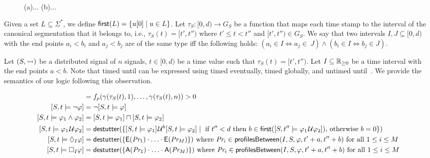 \begin{figure}
	\caption{\TODO (a)... (b)...}
\end{figure}

Given a set $L \subseteq \Sigma^*$, we define $\first(L) = \{ u[0] \st u \in L\}$.
Let $\tau_S : [0,d) \to G_S$ be a function that maps each time stamp to the interval of the canonical segmentation that it belongs to, i.e., $\tau_S(t) = [t', t'')$ where $t' \leq t < t''$ and $[t', t'') \in G_S$.
We say that two intervals $I, J \subseteq [0,d)$ with the end points $a_i < b_i$ and $a_j < b_j$ are of the same type iff the following holds: $(a_i \in I \iff a_j \in~J) \land (b_i \in I \iff b_j \in J)$.

Let $(S, {\rightsquigarrow})$ be a distributed signal of $n$ signals, $t \in [0,d)$ be a time value such that $\tau_S(t) = [t', t'')$.
Let $I \subseteq \mathbb{R}_{\geq 0}$ be a time interval with the end points $a < b$.
Note that timed until can be expressed using timed eventually, timed globally, and untimed until~\cite{DBLP:journals/sttt/MalerN13}.
We provide the semantics of our logic following this observation.

\scriptsize
\begin{align*}
	[S,t \models p] &=  f_p(\gamma(\tau_S(t), 1), \ldots, \gamma(\tau_S(t), n)) > 0 \\
	[S,t \models \lnot \varphi] &= \lnot [S,t \models \varphi] \\
	[S,t \models \varphi_1 \land \varphi_2] &= [S,t \models \varphi_1] \sqcap [S,t \models \varphi_2] \\
	[S,t \models \varphi_1 \until \varphi_2] &= \destutter(\{ [S,t \models \varphi_1] \until^b [S,t \models \varphi_2] \st \text{ if $t'' < d$ then $b \in \first([S,t'' \models \varphi_1 \until \varphi_2])$, otherwise $b = 0$} \}) \\
	[S,t \models \LTLf_I \varphi] &= \destutter(\{ \mathsf{E}(\textit{Pr}_1) \cdot \ldots \cdot \mathsf{E}(\textit{Pr}_M) \}) \text{ where $\textit{Pr}_i \in \mathsf{profilesBetween}(I, S, \varphi, t' + a, t'' + b)$ for all $1 \leq i \leq M$} \\
	[S,t \models \LTLg_I \varphi] &= \destutter(\{ \mathsf{A}(\textit{Pr}_1) \cdot \ldots \cdot \mathsf{A}(\textit{Pr}_M) \}) \text{ where $\textit{Pr}_i \in \mathsf{profilesBetween}(I, S, \varphi, t' + a, t'' + b)$ for all $1 \leq i \leq M$}
\end{align*}
\normalsize

